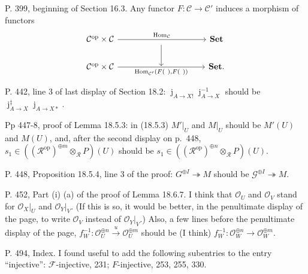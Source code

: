 \documentclass[12pt]{article}
\theoremstyle{remark}
\theoremstyle{definition}
\newcommand{\cc}{\mathcal}
\newcommand{\A}{\mathcal A}
\newcommand{\C}{\mathcal C}
\newcommand{\epi}{\twoheadrightarrow}
\newcommand{\oo}{\operatorname}
\newcommand{\Set}{\mathbf{Set}}
\newcommand{\xr}{\xrightarrow}
\DeclareMathOperator{\jj}{j}
\DeclareMathOperator{\Hom}{Hom}%
\DeclareMathOperator{\op}{op}
\begin{document}
\noindent P. 399, beginning of Section 16.3. Any functor $F:\C\to\C'$ induces a morphism of functors 
$$
\begin{tikzcd}
%
\C^{\op}\times\C\ar{rrrr}{\Hom_\C}&&\ar{d}&&\Set\\ 
\C^{\op}\times\C\ar{rrrr}[swap]{\Hom_{\C'}(F(\ ),F(\ ))}&&{}&&\Set.
%
\end{tikzcd}
$$


\noindent P. 442, line 3 of last display of Section 18.2: $\jj_{A\to X!}\jj_{A\to X}^{-1}$ should be $\jj_{A\to X}^\ddagger\jj_{A\to X*}$.

\noindent Pp 447-8, proof of Lemma 18.5.3: in (18.5.3) $M'|_U$ and $M|_U$ should be $M'(U)$ and $M(U)$, and, after the second display on p.~448, $s_1\in((\cc R^{\op})^{\oplus m}\otimes_{\cc R}P)(U)$ should be $s_1\in((\cc R^{\op})^{\oplus n}\otimes_{\cc R}P)(U)$.

\noindent P. 448, Proposition 18.5.4, line 3 of the proof: $G^{\oplus I}\epi M$ should be $\cc G^{\oplus I}\epi M$.

\noindent P. 452, Part (i) (a) of the proof of Lemma 18.6.7. I think that $\cc O_U$ and $\cc O_V$ stand for $\cc O_X|_U$ and $\cc O_Y|_V$. (If this is so, it would be better, in the penultimate display of the page, to write $\cc O_V$ instead of $\cc O_Y|_V$.) Also, a few lines before the penultimate display of the page, $f_W^{-1}:\cc O_U^{\oplus n}\xr u\cc O_U^{\oplus m}$ should be (I think) $f_W^{-1}:\cc O_W^{\oplus n}\to\cc O_W^{\oplus m}$.

\noindent P. 494, Index. I found useful to add the following subentries to the entry ``injective'': $\cc F$-injective, 231; $F$-injective, 253, 255, 330.
%
\end{document}
